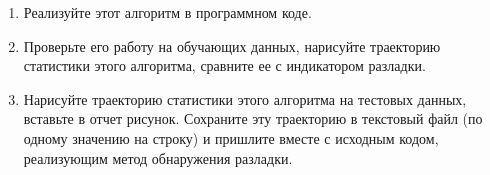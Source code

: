 \documentclass[a4paper,14pt]{extreport}
\renewcommand{\=}[1]{\stackrel{#1}{=}} %
\begin{document}
\begin{enumerate}
\begin{enumerate}
        \item Реализуйте этот алгоритм в программном коде.

        \item Проверьте его работу на обучающих данных,
        нарисуйте траекторию статистики этого алгоритма,
        сравните ее с индикатором разладки.

        \item Нарисуйте траекторию статистики этого алгоритма на тестовых данных, вставьте
        в отчет рисунок. Сохраните эту траекторию
        в текстовый файл (по одному значению на строку)
        и пришлите вместе с исходным кодом,
        реализующим метод обнаружения разладки.
    \end{enumerate}


\end{enumerate}
\end{document}

